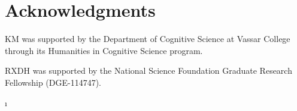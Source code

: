 \documentclass[10pt,letterpaper]{article}
\begin{document}
\section{Acknowledgments}

KM was supported by the Department of Cognitive Science at Vassar College through its Humanities in Cognitive Science program.

RXDH was supported by the National Science Foundation Graduate Research Fellowship (DGE-114747). 




\setlength{\bibleftmargin}{.125in}
\setlength{\bibindent}{-\bibleftmargin}ı
\end{document}
